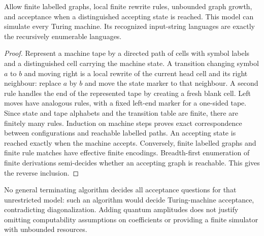 \begin{proposition}
Allow finite labelled graphs, local finite rewrite rules, unbounded graph growth, and acceptance when a distinguished accepting state is reached. This model can simulate every Turing machine. Its recognized input-string languages are exactly the recursively enumerable languages.
\end{proposition}
\begin{proof}
Represent a machine tape by a directed path of cells with symbol labels and a distinguished cell carrying the machine state. A transition changing symbol $a$ to $b$ and moving right is a local rewrite of the current head cell and its right neighbour: replace $a$ by $b$ and move the state marker to that neighbour. A second rule handles the end of the represented tape by creating a fresh blank cell. Left moves have analogous rules, with a fixed left-end marker for a one-sided tape. Since state and tape alphabets and the transition table are finite, there are finitely many rules. Induction on machine steps proves exact correspondence between configurations and reachable labelled paths. An accepting state is reached exactly when the machine accepts. Conversely, finite labelled graphs and finite rule matches have effective finite encodings. Breadth-first enumeration of finite derivations semi-decides whether an accepting graph is reachable. This gives the reverse inclusion.
\end{proof}

No general terminating algorithm decides all acceptance questions for that unrestricted model: such an algorithm would decide Turing-machine acceptance, contradicting diagonalization. Adding quantum amplitudes does not justify omitting computability assumptions on coefficients or providing a finite simulator with unbounded resources.

